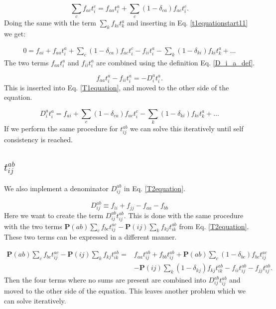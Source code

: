 \documentclass[a4paper,norsk,11pt,twoside]{report}
\begin{document}
\begin{equation}
\sum_c f_{ac} t_i^c = f_{aa} t_i^a + \sum_c 
(1 - \delta_{ca} ) f_{ac} t_i^c .
\end{equation}
Doing the same with the term $\sum_k f_{ki} t_k^a$ and inserting in Eq. \eqref{t1equationstart11} we get:

\begin{align}
0 = f_{ai} + f_{aa} t_i^a + \sum_c 
(1 - \delta_{ca} ) f_{ac} t_i^c - f_{ii} t_i^a - \sum_k (1 - \delta_{ki}) f_{ki} t_k^a + \dots \nonumber
\end{align}
The two terms $f_{aa} t_i^a$ and $f_{ii} t_i^a$ are combined using the definition Eq. \eqref{D_i_a_def}. 

\begin{equation}
f_{aa} t_i^a - f_{ii} t_i^a = -D_i^a t_i^a .
\end{equation}
This is inserted into Eq. \eqref{T1equation}, and moved to the other side of the equation.

\begin{equation}
D_i^a t_i^a = f_{ai} + \sum_c 
(1 - \delta_{ca} ) f_{ac} t_i^c - \sum_k (1 - \delta_{ki}) f_{ki} t_k^a + \dots
\end{equation}
If we perform the same procedure for $t_{ij}^{ab}$ we can solve this iteratively until self consistency is reached.

\subsection{$t_{ij}^{ab}$}
We also implement a denominator $D_{ij}^{ab}$ in Eq. \eqref{T2equation}. 

\begin{equation}
D_{ij}^{ab} \equiv f_{ii} + f_{jj} - f_{aa} - f_{bb}
\end{equation}
Here we want to create the term $D_{ij}^{ab} t_{ij}^{ab}$. This is done with the same procedure with the two terms $\textbf{P}(ab) \sum_c f_{bc} t_{ij}^{ac}
- \textbf{P}(ij) \sum_k f_{kj} t_{ik}^{ab}$ from Eq. \eqref{T2equation}. These two terms can be expressed in a different manner.

\begin{align}
\textbf{P}(ab) \sum_c f_{bc} t_{ij}^{ac}
- \textbf{P}(ij) \sum_k f_{kj} t_{ik}^{ab} = & 
f_{aa} t_{ij}^{ab} + f_{bb} t_{ij}^{ab} + 
\textbf{P}(ab) \sum_c (1-\delta_{bc}) f_{bc} t_{ij}^{ac} \nonumber \\ &
- \textbf{P}(ij) \sum_k (1-\delta_{kj}) f_{kj} t_{ik}^{ab}
- f_{ii} t_{ij}^{ab}
- f_{jj} t_{ij}^{ab} . \nonumber
\end{align}
Then the four terms where no sums are present are combined into $D_{ij}^{ab} t_{ij}^{ab}$ and moved to the other side of the equation. This leaves another problem which we can solve iteratively.
\end{document}
